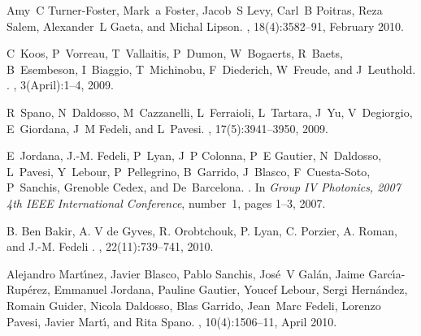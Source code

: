 \begin{thebibliography}{1}

Amy~C Turner-Foster, Mark~a Foster, Jacob~S Levy, Carl~B Poitras, Reza Salem,
  Alexander~L Gaeta, and Michal Lipson.
, 18(4):3582--91, February 2010.

C~Koos, P~Vorreau, T~Vallaitis, P~Dumon, W~Bogaerts, R~Baets, B~Esembeson,
  I~Biaggio, T~Michinobu, F~Diederich, W~Freude, and J~Leuthold.
.
, 3(April):1--4, 2009.

R~Spano, N~Daldosso, M~Cazzanelli, L~Ferraioli, L~Tartara, J~Yu, V~Degiorgio,
  E~Giordana, J~M Fedeli, and L~Pavesi.
, 17(5):3941--3950, 2009.

E~Jordana, J.-M. Fedeli, P~Lyan, J~P Colonna, P~E Gautier, N~Daldosso,
  L~Pavesi, Y~Lebour, P~Pellegrino, B~Garrido, J~Blasco, F~Cuesta-Soto,
  P~Sanchis, Grenoble Cedex, and De~Barcelona.
.
\newblock In {\em Group IV Photonics, 2007 4th IEEE International Conference},
  number~1, pages 1--3, 2007.
  
B. Ben Bakir, A. V de Gyves, R. Orobtchouk, P. Lyan, C. Porzier, A. Roman, and J.-M. Fedeli
.
, 22(11):739--741, 2010.

Alejandro Mart\'{\i}nez, Javier Blasco, Pablo Sanchis, Jos\'{e}~V Gal\'{a}n,
  Jaime Garc\'{\i}a-Rup\'{e}rez, Emmanuel Jordana, Pauline Gautier, Youcef
  Lebour, Sergi Hern\'{a}ndez, Romain Guider, Nicola Daldosso, Blas Garrido,
  Jean~Marc Fedeli, Lorenzo Pavesi, Javier Mart\'{\i}, and Rita Spano.
, 10(4):1506--11, April 2010.

\end{thebibliography}
